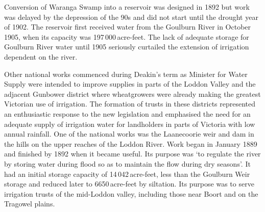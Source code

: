 Conversion of Waranga Swamp into a
reservoir  was
designed in 1892 but work was delayed by the depression of the 90s and
did not start until the drought year of 1902.  The
reservoir first received water from the Goulburn River
 in October 1905, when its capacity was
197\,000\,acre-feet.  The lack of adequate storage for Goulburn River
water until 1905 seriously curtailed the extension of irrigation
dependent on the river.

Other national works commenced during Deakin's term as Minister for
Water Supply were intended to improve supplies in parts of the Loddon
Valley  and the adjacent Gunbower district where
wheatgrowers were already making the greatest Victorian
use of irrigation.  The formation of trusts in these districts
represented an enthusiastic response to the new legislation and
emphasised the need for an adequate supply of irrigation water for
landholders in parts of Victoria with low annual rainfall.  One of the
national works was the Laanecoorie weir
 and dam in the hills on
the upper reaches of the Loddon River.  Work began in January 1889 and
finished by 1892 when it became useful.  Its purpose was `to regulate
the river by storing water during flood so as to maintain
the flow during dry seasons'.  It had an initial storage capacity of
14\,042\,acre-feet, less than the Goulburn Weir 
storage and reduced later to 6650\,acre-feet by siltation.  Its
purpose was to serve irrigation trusts of the mid-Loddon valley,
including those near Boort  and on the Tragowel
plains.

